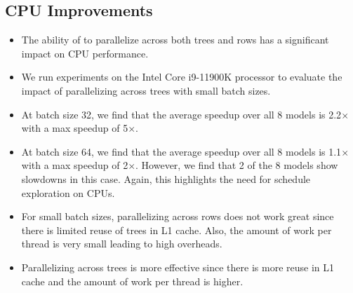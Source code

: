 \subsection{CPU Improvements}
\begin{itemize}
  \item The ability of \Treebeard{} to parallelize across both trees and rows has a significant impact on CPU performance.
  \item We run experiments on the Intel Core i9-11900K processor to evaluate the impact of parallelizing across trees with small batch sizes. 
  \item At batch size 32, we find that the average speedup over all 8 models is 2.2$\times$ with a max speedup of 5$\times$.
  \item At batch size 64, we find that the average speedup over all 8 models is 1.1$\times$ with a max speedup of 2$\times$. 
  However, we find that 2 of the 8 models show slowdowns in this case. Again, this highlights the need for schedule exploration on CPUs.
  \item For small batch sizes, parallelizing across rows does not work great since there is limited reuse of trees in L1 cache.
  Also, the amount of work per thread is very small leading to high overheads. 
  \item Parallelizing across trees is more effective since there is more reuse in L1 cache and the amount of work per thread is higher.  
\end{itemize}